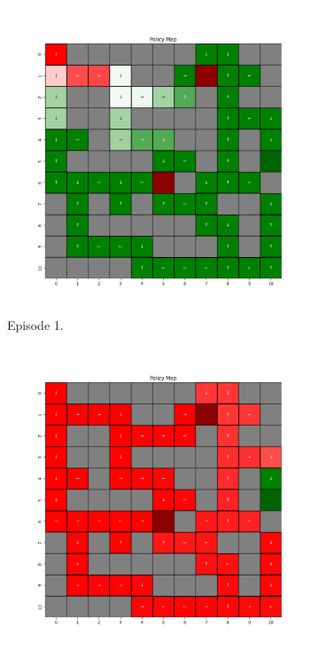 \documentclass{assignment}
\begin{document}
\begin{figure}[H]
    \begin{subfigure}{0.3\textwidth}
        \includegraphics[width=\textwidth]{figures/policy_q/gamma_sweep/policy_alpha_0.1_gamma_0.5_epsilon_0.2_iteration_1.png}
    \caption{Episode 1.}
    \end{subfigure}\hfill
    \begin{subfigure}{0.3\textwidth}
        \includegraphics[width=\textwidth]{figures/policy_q/gamma_sweep/policy_alpha_0.1_gamma_0.5_epsilon_0.2_iteration_50.png}

\end{subfigure}
\end{figure}
\end{document}
